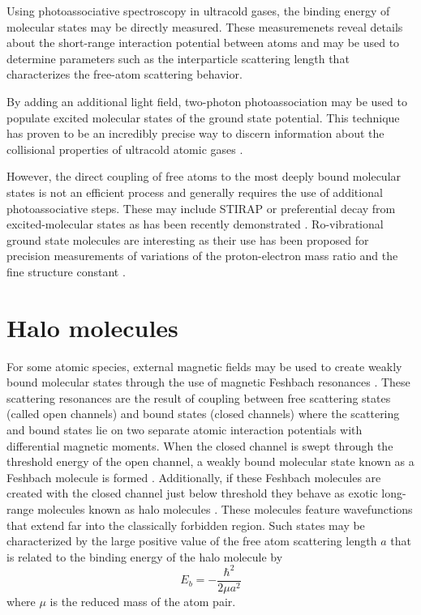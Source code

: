 Using photoassociative spectroscopy in ultracold gases, the binding energy of molecular states may be directly measured.
These measuremenets reveal details about the short-range interaction potential between atoms and may be used to determine parameters such as the interparticle scattering length that characterizes the free-atom scattering behavior.

By adding an additional light field, two-photon photoassociation may be used to populate excited molecular states of the ground state potential.
This technique has proven to be an incredibly precise way to discern information about the collisional properties of ultracold atomic gases \cite{MartinezDeEscobar2008, Aman2018}.

However, the direct coupling of free atoms to the most deeply bound molecular states is not an efficient process and generally requires the use of additional photoassociative steps.
These may include STIRAP or preferential decay from excited-molecular states as has been recently demonstrated \cite{Reinaudi2012, cbc17, Stellmer2012, Ciamei2017}.
Ro-vibrational ground state molecules are interesting as their use has been proposed for precision measurements of variations of the proton-electron mass ratio \cite{zky08, Kotochigova2009} and the fine structure constant \cite{Beloy2011}. 


\section{Halo molecules} \label{sec:halo}
For some atomic species, external magnetic fields may be used to create weakly bound molecular states through the use of magnetic Feshbach resonances \cite{Kohler2006, Chin2010}.
These scattering resonances are the result of coupling between free scattering states (called open channels) and bound states (closed channels) where the scattering and bound states lie on two separate atomic interaction potentials with differential magnetic moments.
When the closed channel is swept through the threshold energy of the open channel, a weakly bound molecular state known as a Feshbach molecule is formed \cite{cbk03, grj03,hkm03,rtb03,sph03}.
Additionally, if these Feshbach molecules are created with the closed channel just below threshold they behave as exotic long-range molecules known as halo molecules \cite{Kohler2006}.
These molecules feature wavefunctions that extend far into the classically forbidden region.
Such states may be characterized by the large positive value of the free atom scattering length $a$ that is related to the binding energy of the halo molecule by
\begin{equation}
	E_b = -\frac{\hbar^2}{2 \mu a^2}
\end{equation}
where $\mu$ is the reduced mass of the atom pair.

